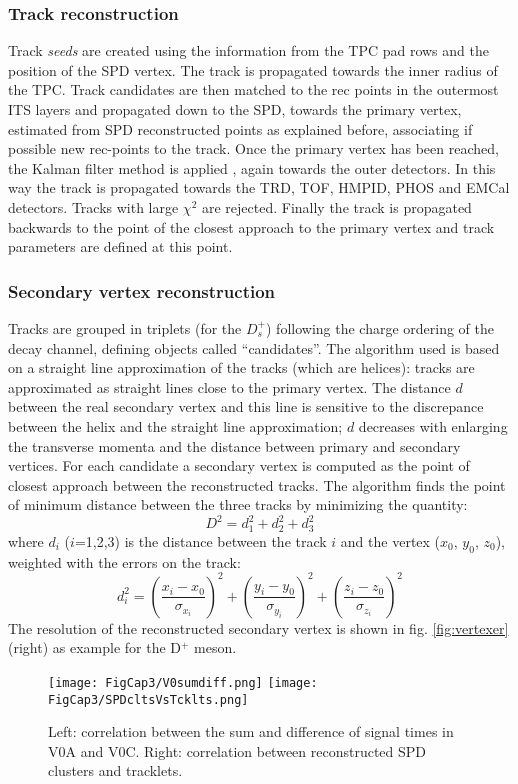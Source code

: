 \subsubsection{Track reconstruction}
Track \textit{seeds} are created using the information from the TPC pad rows and the position of the SPD vertex. The track is propagated towards the inner radius of the TPC. Track candidates are then matched to the rec points in the outermost ITS layers and propagated down to the SPD, towards the primary vertex, estimated from SPD reconstructed points as
explained before, associating if possible new rec-points to the track. Once the primary vertex has been reached, the Kalman filter method is applied \cite{kalman}, again towards the outer detectors. In this way the track is propagated towards the TRD, TOF, HMPID, PHOS and EMCal detectors. Tracks with large $\chi^2$ are rejected. Finally the track is propagated backwards to the point of the closest approach to the primary vertex and track parameters are defined at this point.

\subsubsection{Secondary vertex reconstruction}
Tracks are grouped in triplets (for the $D^+_s$) following the charge ordering of the decay channel, defining objects called ``candidates''. The algorithm used is based on a straight line approximation of the tracks (which are helices): tracks are approximated as straight lines close to the primary vertex. The distance $d$ between the real secondary vertex and this line is sensitive to the discrepance between the helix and the straight line approximation; $d$ decreases with enlarging the transverse momenta and the distance between primary and secondary vertices. For each candidate a secondary vertex is computed as the point of closest approach between the reconstructed tracks. The algorithm finds the point of minimum distance between the three tracks by minimizing the quantity:
\begin{equation}
D^2=d^2_1+d^2_2+d^2_3
\end{equation}
where $d_i$ ($i$=1,2,3) is the distance between the track $i$ and the vertex ($x_0$, $y_0$, $z_0$), weighted with the errors on the track:
\begin{equation}
d^2_i=\left(\frac{x_i-x_0}{\sigma_{x_i}}\right)^2+
\left(\frac{y_i-y_0}{\sigma_{y_i}}\right)^2+\left(\frac{z_i-z_0}{\sigma_{z_i}}\right)^2\end{equation}
The resolution of the reconstructed secondary vertex is shown in fig. \ref{fig:vertexer} (right) as example for  the D$^+$ meson.
\fi
\begin{figure}[!t]
\centering
\texttt{[image: FigCap3/V0sumdiff.png]}
\texttt{[image: FigCap3/SPDcltsVsTcklts.png]}
\caption{Left: correlation between the sum and difference of signal times in V0A and V0C. Right: correlation between reconstructed SPD clusters and tracklets. }
\label{fig:V0sumdiff}
\end{figure}

